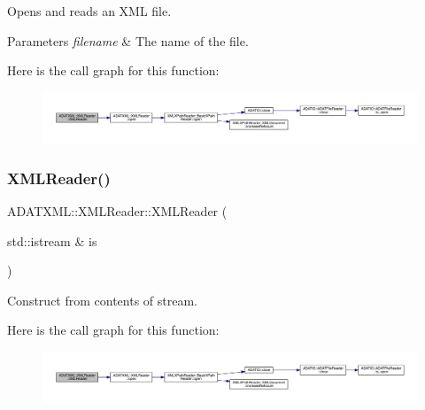 Opens and reads an X\+ML file. 
\begin{DoxyParams}{Parameters}
{\em filename} & The name of the file. \\
\hline
\end{DoxyParams}
Here is the call graph for this function\+:
\nopagebreak
\begin{figure}[H]
\begin{center}
\leavevmode
\includegraphics[width=350pt]{db/d3f/classADATXML_1_1XMLReader_a85d8af8a27febdd66251e20bd96ccc32_cgraph}
\end{center}
\end{figure}
\mbox{\label{classADATXML_1_1XMLReader_a8025cb1c53d6ceb8a694bdbd8e1f383b}} 
\subsubsection{\texorpdfstring{XMLReader()}{XMLReader()}\hspace{0.1cm}{\footnotesize\ttfamily [3/10]}}
{\footnotesize\ttfamily A\+D\+A\+T\+X\+M\+L\+::\+X\+M\+L\+Reader\+::\+X\+M\+L\+Reader (\begin{DoxyParamCaption}\item[{std\+::istream \&}]{is }\end{DoxyParamCaption})\hspace{0.3cm}{\ttfamily [inline]}}



Construct from contents of stream. 

Here is the call graph for this function\+:
\nopagebreak
\begin{figure}[H]
\begin{center}
\leavevmode
\includegraphics[width=350pt]{db/d3f/classADATXML_1_1XMLReader_a8025cb1c53d6ceb8a694bdbd8e1f383b_cgraph}
\end{center}
\end{figure}
\mbox{\label{classADATXML_1_1XMLReader_a6829255c2dd448f4bf315f6fd0b380a1}} 
